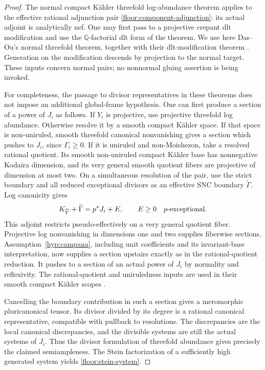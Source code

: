 \documentclass[11pt,letterpaper]{article}
\theoremstyle{definition}
\theoremstyle{remark}
\begin{document}
\begin{proof}
The normal compact K\"ahler threefold log-abundance theorem applies to
the effective rational adjunction pair
\eqref{floor:component-adjunction}: its actual adjoint is analytically
nef.  One may first pass to a projective crepant dlt modification and
use the $\mathbb{Q}$-factorial dlt form of the theorem.  We use here
Das--Ou's normal threefold theorem, together with their dlt-modification
theorem \cite[Corollary~1.3]{DasOuAbundanceII}
\cite[Theorem~5.2]{DasOuAbundanceI}.  Generation on the modification
descends by projection to the normal target.  These inputs concern
normal pairs; no nonnormal gluing assertion is being invoked.

For completeness, the passage to divisor representatives in these
theorems does not impose an additional global-frame hypothesis.  One
can first produce a section of a power of $J_i$ as follows.  If $Y_i$
is projective, use projective threefold log abundance.  Otherwise
resolve it by a smooth compact K\"ahler space.  If that space is
non-uniruled, smooth threefold canonical nonvanishing gives a section
which pushes to $J_i$, since $\Gamma_i\ge0$.  If it is uniruled and
non-Moishezon, take a resolved rational quotient.  Its smooth
non-uniruled compact K\"ahler base has nonnegative Kodaira dimension,
and its very general smooth quotient fibers are projective of
dimension at most two.  On a simultaneous resolution of the pair,
use the strict boundary and all reduced exceptional divisors as an
effective SNC boundary $\widetilde\Gamma$.  Log canonicity gives
\[
 K_{\widetilde Y}+\widetilde\Gamma
   =p^*J_i+E,\qquad E\ge0\quad\hbox{$p$-exceptional}.
\]
This adjoint restricts pseudo-effectively on a very general quotient
fiber.  Projective log nonvanishing in dimensions one and two supplies
fiberwise sections.  Assumption~\ref{hyp:campana}, including unit
coefficients and its invariant-base interpretation, now supplies a
section upstairs exactly as in the rational-quotient reduction.  It
pushes to a section of an actual power of $J_i$ by normality and
reflexivity.  The rational-quotient and uniruledness inputs are used in
their smooth compact K\"ahler scopes
\cite{CampanaRationalQuotient,OuUniruledness}.

Cancelling the boundary contribution in such a section gives a
meromorphic pluricanonical tensor.  Its divisor divided by its degree
is a rational canonical representative, compatible with pullback to
resolutions.  The discrepancies are the local canonical
discrepancies, and the divisible systems are still the actual
systems of $J_i$.  Thus the divisor formulation of threefold
abundance gives precisely the claimed semiampleness.  The Stein
factorization of a sufficiently high generated system yields
\eqref{floor:stein-system}.
\end{proof}
\end{document}
